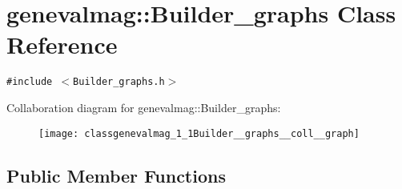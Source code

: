 \hypertarget{classgenevalmag_1_1Builder__graphs}{
\section{genevalmag::Builder\_\-graphs Class Reference}
\label{classgenevalmag_1_1Builder__graphs}
}
{\tt \#include $<$Builder\_\-graphs.h$>$}

Collaboration diagram for genevalmag::Builder\_\-graphs:\nopagebreak
\begin{figure}[H]
\begin{center}
\leavevmode
\texttt{[image: classgenevalmag\_1\_1Builder\_\_graphs\_\_coll\_\_graph]}
\end{center}
\end{figure}
\subsection*{Public Member Functions}
